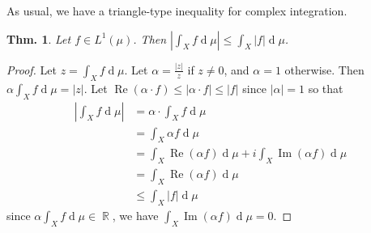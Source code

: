 \documentclass[12pt, a4paper]{book}
\DeclareMathOperator{\R}{\mathbb{R}}
\DeclareMathOperator{\re}{Re}
\DeclareMathOperator{\im}{Im}
\renewcommand{\d}[1]{\ensuremath{\operatorname{d}\!{#1}}} %
\newtheorem{theorem}{Thm.}[section]
\theoremstyle{nonumberplain}
\newtheorem{proof}{Proof}
\begin{document}
As usual, we have a triangle-type inequality for complex integration.
\begin{theorem}
    Let $f\in L^1(\mu)$.
    Then $\left\lvert\int_X f\d{\mu}\right\rvert\leq\int_X|f|\d{\mu}$.
\end{theorem}
\begin{proof}
    Let $z=\int_X f\d{\mu}$.
    Let $\alpha=\frac{|z|}{z}$ if $z\neq 0$, and $\alpha=1$ otherwise.
    Then $\alpha\int_X f\d{\mu}=|z|$.
    Let $\re(\alpha\cdot f)\leq |\alpha\cdot f|\leq |f|$ since $|\alpha|=1$ so that
    \begin{align*}
        \left\lvert\int_X f\d{\mu}\right\rvert &= \alpha\cdot\int_X f\d{\mu}\\
                                               &=\int_X\alpha f\d{\mu}\\
                                               &= \int_X\re(\alpha f)\d{\mu}+i\int_X\im(\alpha f)\d{\mu}\\
                                               &= \int_X\re(\alpha f)\d{\mu}\\
                                               &\leq \int_X|f|\d{\mu}
    \end{align*}
    since $\alpha\int_X f\d{\mu}\in\R$, we have $\int_X\im(\alpha f)\d{\mu}=0$.
\end{proof}
\end{document}
